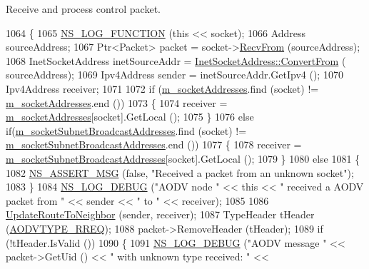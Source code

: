 Receive and process control packet. 


\begin{DoxyCode}
1064 \{
1065   \hyperlink{log-macros-disabled_8h_a90b90d5bad1f39cb1b64923ea94c0761}{NS\_LOG\_FUNCTION} (\textcolor{keyword}{this} << socket);
1066   Address sourceAddress;
1067   Ptr<Packet> packet = socket->\hyperlink{classns3_1_1Socket_af22378d7af9a2745a9eada20210da215}{RecvFrom} (sourceAddress);
1068   InetSocketAddress inetSourceAddr = \hyperlink{classns3_1_1InetSocketAddress_ade776b1109e7b9a7be0b22ced49931e3}{InetSocketAddress::ConvertFrom} (
      sourceAddress);
1069   Ipv4Address sender = inetSourceAddr.GetIpv4 ();
1070   Ipv4Address receiver;
1071 
1072   \textcolor{keywordflow}{if} (\hyperlink{classns3_1_1aodv_1_1RoutingProtocol_aa3263563cbbd735faafbf17fd4e28a10}{m\_socketAddresses}.find (socket) != \hyperlink{classns3_1_1aodv_1_1RoutingProtocol_aa3263563cbbd735faafbf17fd4e28a10}{m\_socketAddresses}.end ())
1073     \{
1074       receiver = \hyperlink{classns3_1_1aodv_1_1RoutingProtocol_aa3263563cbbd735faafbf17fd4e28a10}{m\_socketAddresses}[socket].GetLocal ();
1075     \}
1076   \textcolor{keywordflow}{else} \textcolor{keywordflow}{if}(\hyperlink{classns3_1_1aodv_1_1RoutingProtocol_a3516a9ee6cc1a0ebde0fdc08680dc7c4}{m\_socketSubnetBroadcastAddresses}.find (socket) != 
      \hyperlink{classns3_1_1aodv_1_1RoutingProtocol_a3516a9ee6cc1a0ebde0fdc08680dc7c4}{m\_socketSubnetBroadcastAddresses}.end ())
1077     \{
1078       receiver = \hyperlink{classns3_1_1aodv_1_1RoutingProtocol_a3516a9ee6cc1a0ebde0fdc08680dc7c4}{m\_socketSubnetBroadcastAddresses}[socket].GetLocal ();
1079     \}
1080   \textcolor{keywordflow}{else}
1081     \{
1082       \hyperlink{assert_8h_aff5ece9066c74e681e74999856f08539}{NS\_ASSERT\_MSG} (\textcolor{keyword}{false}, \textcolor{stringliteral}{"Received a packet from an unknown socket"});
1083     \}
1084   \hyperlink{group__logging_ga413f1886406d49f59a6a0a89b77b4d0a}{NS\_LOG\_DEBUG} (\textcolor{stringliteral}{"AODV node "} << \textcolor{keyword}{this} << \textcolor{stringliteral}{" received a AODV packet from "} << sender << \textcolor{stringliteral}{" to "} << 
      receiver);
1085 
1086   \hyperlink{classns3_1_1aodv_1_1RoutingProtocol_a0df782358a389aadd46ceffab9535cef}{UpdateRouteToNeighbor} (sender, receiver);
1087   TypeHeader tHeader (\hyperlink{namespacens3_1_1aodv_a8cf417608302ba0ed75225c976944d44ad5f62dc18635d788b1a5b0dd834d46f0}{AODVTYPE\_RREQ});
1088   packet->RemoveHeader (tHeader);
1089   \textcolor{keywordflow}{if} (!tHeader.IsValid ())
1090     \{
1091       \hyperlink{group__logging_ga413f1886406d49f59a6a0a89b77b4d0a}{NS\_LOG\_DEBUG} (\textcolor{stringliteral}{"AODV message "} << packet->GetUid () << \textcolor{stringliteral}{" with unknown type received: "} << 

\end{DoxyCode}
